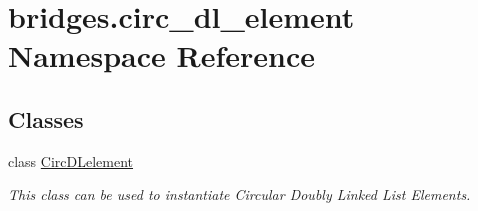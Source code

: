 \hypertarget{namespacebridges_1_1circ__dl__element}{}\section{bridges.\+circ\+\_\+dl\+\_\+element Namespace Reference}
\label{namespacebridges_1_1circ__dl__element}
\subsection*{Classes}
\begin{DoxyCompactItemize}
\item 
class \mbox{\hyperlink{classbridges_1_1circ__dl__element_1_1_circ_d_lelement}{Circ\+D\+Lelement}}
\begin{DoxyCompactList}\small\item\em This class can be used to instantiate Circular Doubly Linked List Elements. \end{DoxyCompactList}\end{DoxyCompactItemize}
